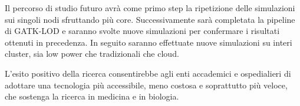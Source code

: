 Il percorso di studio futuro avrà come primo step la ripetizione delle simulazioni sui singoli nodi sfruttando più core. 
Successivamente sarà completata la pipeline di GATK-LOD e saranno svolte nuove simulazioni per confermare i risultati ottenuti in precedenza.
In seguito saranno effettuate nuove simulazioni su interi cluster, sia low power che tradizionali che cloud.

L'esito positivo della ricerca consentirebbe agli enti accademici e ospedialieri di adottare una tecnologia più accessibile, meno costosa e soprattutto più veloce, che sostenga la ricerca in medicina e in biologia.


